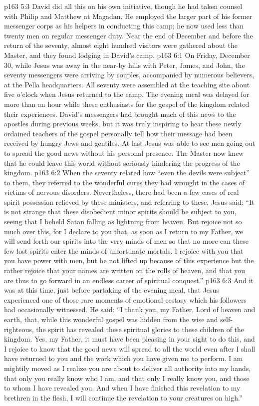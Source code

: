 \vs p163 5:3 David did all this on his own initiative, though he had taken counsel with Philip and Matthew at Magadan. He employed the larger part of his former messenger corps as his helpers in conducting this camp; he now used less than twenty men on regular messenger duty. Near the end of December and before the return of the seventy, almost eight hundred visitors were gathered about the Master, and they found lodging in David’s camp.
\vs p163 6:1 On Friday, December 30, while Jesus was away in the near\hyp{}by hills with Peter, James, and John, the seventy messengers were arriving by couples, accompanied by numerous believers, at the Pella headquarters. All seventy were assembled at the teaching site about five o’clock when Jesus returned to the camp. The evening meal was delayed for more than an hour while these enthusiasts for the gospel of the kingdom related their experiences. David’s messengers had brought much of this news to the apostles during previous weeks, but it was truly inspiring to hear these newly ordained teachers of the gospel personally tell how their message had been received by hungry Jews and gentiles. At last Jesus was able to see men going out to spread the good news without his personal presence. The Master now knew that he could leave this world without seriously hindering the progress of the kingdom.\plusone
\vs p163 6:2 When the seventy related how “even the devils were subject” to them, they referred to the wonderful cures they had wrought in the cases of victims of nervous disorders. Nevertheless, there had been a few cases of real spirit possession relieved by these ministers, and referring to these, Jesus said: \textcolor{ubdarkred}{“It is not strange that these disobedient minor spirits should be subject to you, seeing that I beheld Satan falling as lightning from heaven. But rejoice not so much over this, for I declare to you that, as soon as I return to my Father, we will send forth our spirits into the very minds of men so that no more can these few lost spirits enter the minds of unfortunate mortals. I rejoice with you that you have power with men, but be not lifted up because of this experience but the rather rejoice that your names are written on the rolls of heaven, and that you are thus to go forward in an endless career of spiritual conquest.”}
\vs p163 6:3 And it was at this time, just before partaking of the evening meal, that Jesus experienced one of those rare moments of emotional ecstasy which his followers had occasionally witnessed. He said: \textcolor{ubdarkred}{“I thank you, my Father, Lord of heaven and earth, that, while this wonderful gospel was hidden from the wise and self\hyp{}righteous, the spirit has revealed these spiritual glories to these children of the kingdom. Yes, my Father, it must have been pleasing in your sight to do this, and I rejoice to know that the good news will spread to all the world even after I shall have returned to you and the work which you have given me to perform. I am mightily moved as I realize you are about to deliver all authority into my hands, that only you really know who I am, and that only I really know you, and those to whom I have revealed you. And when I have finished this revelation to my brethren in the flesh, I will continue the revelation to your creatures on high.”}
